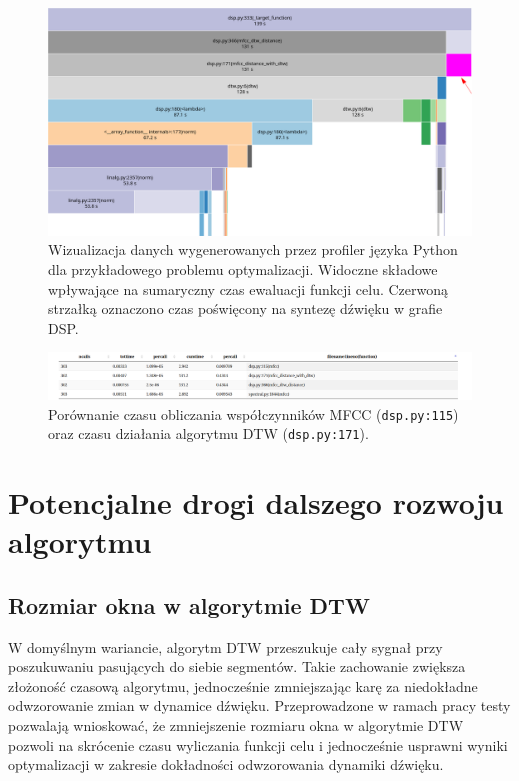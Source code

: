 \begin{figure}[H]
    \centering
    \includegraphics[width=1.0\linewidth]{rys07/profile_target_function_execution.png}
    \caption{
      Wizualizacja danych wygenerowanych przez profiler języka Python
      dla przykładowego problemu optymalizacji. Widoczne składowe wpływające
      na sumaryczny czas ewaluacji funkcji celu.
      Czerwoną strzałką oznaczono czas poświęcony
      na syntezę dźwięku w grafie DSP\@.
    }\label{fig:target_function_profiling}
\end{figure}

\begin{figure}[H]
    \centering
    \includegraphics[width=1.0\linewidth]{rys07/mfcc_search.png}
    \caption{
      Porównanie czasu obliczania współczynników MFCC (\texttt{dsp.py:115})
      oraz czasu działania algorytmu DTW (\texttt{dsp.py:171}).
    }\label{fig:mfcc_profiling}
\end{figure}


\section{Potencjalne drogi dalszego rozwoju algorytmu}\label{sec:potential_improvements}

\subsection{Rozmiar okna w algorytmie DTW}

W domyślnym wariancie, algorytm DTW przeszukuje cały sygnał
przy poszukuwaniu pasujących do siebie segmentów. Takie
zachowanie zwiększa złożoność czasową algorytmu, jednocześnie
zmniejszając karę za niedokładne odwzorowanie zmian w dynamice dźwięku.
Przeprowadzone w ramach pracy testy pozwalają wnioskować, że zmniejszenie
rozmiaru okna w algorytmie DTW pozwoli na skrócenie czasu
wyliczania funkcji celu i jednocześnie usprawni wyniki optymalizacji
w zakresie dokładności odwzorowania dynamiki dźwięku.

